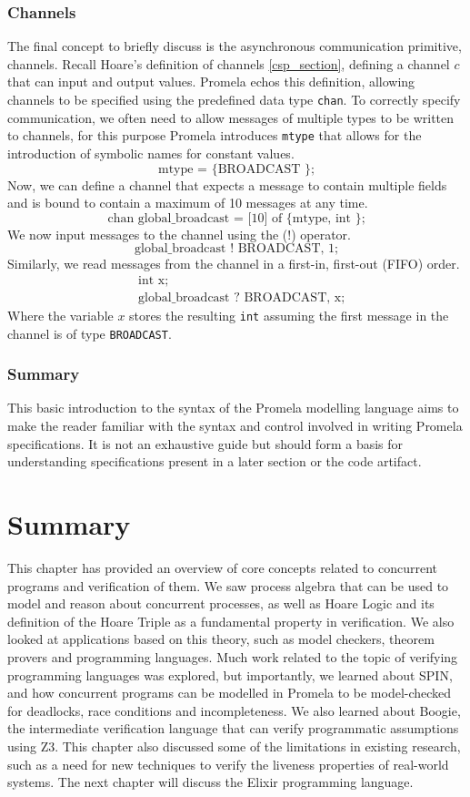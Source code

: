\subsubsection[]{Channels}
The final concept to briefly discuss is the asynchronous communication primitive, channels. Recall Hoare's definition of channels \ref{csp_section}, defining a channel $c$ that can input and output values. Promela echos this definition, allowing channels to be specified using the predefined data type \texttt{chan}. To correctly specify communication, we often need to allow messages of multiple types to be written to channels, for this purpose Promela introduces \texttt{mtype} that allows for the introduction of symbolic names for constant values.
\[
\text{mtype = \{ BROADCAST \};}
\]
Now, we can define a channel that expects a message to contain multiple fields and is bound to contain a maximum of 10 messages at any time.
\[
\text{chan global\_broadcast = [10] of \{ mtype, int \};}
\]
We now input messages to the channel using the (!) operator.
\[
\text{global\_broadcast ! BROADCAST, 1;}
\]
Similarly, we read messages from the channel in a first-in, first-out (FIFO) order.
\[
\begin{aligned}
& \text{int x;} \\
& \text{global\_broadcast ? BROADCAST, x;}
\end{aligned}
\]
Where the variable $x$ stores the resulting \texttt{int} assuming the first message in the channel is of type \texttt{BROADCAST}.
\subsubsection[]{Summary}
This basic introduction to the syntax of the Promela modelling language aims to make the reader familiar with the syntax and control involved in writing Promela specifications. It is not an exhaustive guide but should form a basis for understanding specifications present in a later section or the code artifact.
\section{Summary}
This chapter has provided an overview of core concepts related to concurrent programs and verification of them. We saw process algebra that can be used to model and reason about concurrent processes, as well as Hoare Logic and its definition of the Hoare Triple as a fundamental property in verification. We also looked at applications based on this theory, such as model checkers, theorem provers and programming languages. Much work related to the topic of verifying programming languages was explored, but importantly, we learned about SPIN, and how concurrent programs can be modelled in Promela to be model-checked for deadlocks, race conditions and incompleteness. We also learned about Boogie, the intermediate verification language that can verify programmatic assumptions using Z3. This chapter also discussed some of the limitations in existing research, such as a need for new techniques to verify the liveness properties of real-world systems. The next chapter will discuss the Elixir programming language.

